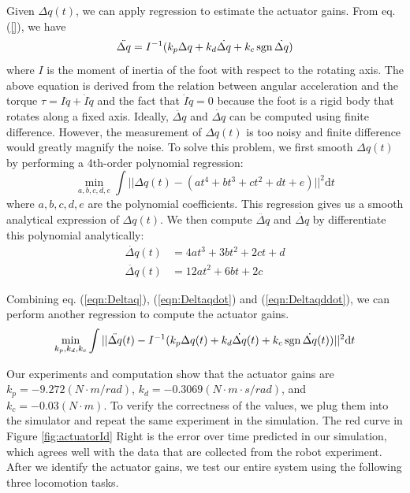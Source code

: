 Given $\Delta q(t)$, we can apply regression to estimate the actuator gains. From eq. (\ref{}), we have
\begin{equation}
\ddot{\Delta q}=I^{-1}(k_p\Delta q + k_d\dot{\Delta q} + k_c\operatorname{sgn}{\dot{\Delta q}})
\end{equation}
where $I$ is the moment of inertia of the foot with respect to the rotating axis. The above equation is derived from the relation between angular acceleration and the torque $\tau = I\ddot{q}+\dot{I}\dot{q}$ and the fact that $\dot{I}\dot{q}=0$ because the foot is a rigid body that rotates along a fixed axis. Ideally, $\ddot{\Delta q}$ and $\dot{\Delta q}$ can be computed using finite difference. However, the measurement of $\Delta q(t)$ is too noisy and finite difference would greatly magnify the noise. To solve this problem, we first smooth $\Delta q(t)$ by performing a 4th-order polynomial regression:
\begin{equation}
  \min_{a,b,c,d,e}\int ||\Delta q(t)-(at^4+bt^3+ct^2+dt+e)||^2\mathrm{d}t
  \label{eqn:Deltaq}
\end{equation}
where $a,b,c,d,e$ are the polynomial coefficients. This regression gives us a smooth analytical expression of $\Delta q(t)$. We then compute $\ddot{\Delta q}$ and $\dot{\Delta q}$ by differentiate this polynomial analytically:
\begin{align}
\label{eqn:Deltaqdot}  \dot{\Delta q}(t)&=4at^3+3bt^2+2ct+d\\
\label{eqn:Deltaqddot}  \ddot{\Delta q}(t)&=12at^2+6bt+2c
\end{align}

Combining eq. (\ref{eqn:Deltaq}), (\ref{eqn:Deltaqdot}) and (\ref{eqn:Deltaqddot}), we can perform another regression to compute the actuator gains.
\begin{equation}
\min_{k_p, k_d, k_c}\int||\ddot{\Delta q}(t)-I^{-1}(k_p\Delta q(t) + k_d\dot{\Delta q}(t) + k_c\operatorname{sgn}{\dot{\Delta q}(t)})||^2\mathrm{d}t
\end{equation}

Our experiments and computation show that the actuator gains are $k_p=-9.272(N\cdot m/rad)$, $k_d=-0.3069(N\cdot m\cdot s/rad)$, and $k_c=-0.03(N\cdot m)$. To verify the correctness of the values, we plug them into the simulator and repeat the same experiment in the simulation. The red curve in Figure \ref{fig:actuatorId} Right is the error over time predicted in our simulation, which agrees well with the data that are collected from the robot experiment. After we identify the actuator gains, we test our entire system using the following three locomotion tasks.

